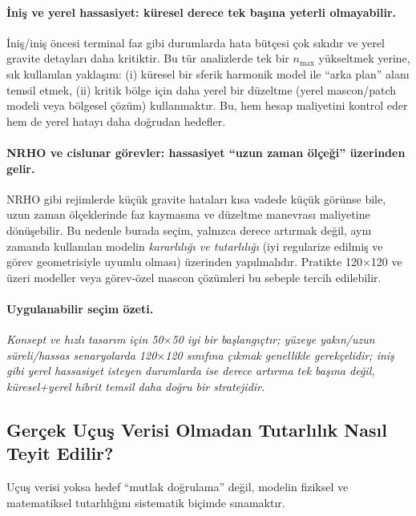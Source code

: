 \paragraph{İniş ve yerel hassasiyet: küresel derece tek başına yeterli olmayabilir.}
İniş/iniş öncesi terminal faz gibi durumlarda hata bütçesi çok sıkıdır ve yerel gravite detayları daha kritiktir.
Bu tür analizlerde tek bir $n_{\max}$ yükseltmek yerine, sık kullanılan yaklaşım:
(i) küresel bir sferik harmonik model ile ``arka plan'' alanı temsil etmek,
(ii) kritik bölge için daha yerel bir düzeltme (yerel mascon/patch modeli veya bölgesel çözüm)
kullanmaktır. Bu, hem hesap maliyetini kontrol eder hem de yerel hatayı daha doğrudan hedefler.

\paragraph{NRHO ve cislunar görevler: hassasiyet ``uzun zaman ölçeği'' üzerinden gelir.}
NRHO gibi rejimlerde küçük gravite hataları kısa vadede küçük görünse bile,
uzun zaman ölçeklerinde faz kaymasına ve düzeltme manevrası maliyetine dönüşebilir.
Bu nedenle burada seçim, yalnızca derece artırmak değil, aynı zamanda kullanılan modelin
\emph{kararlılığı ve tutarlılığı} (iyi regularize edilmiş ve görev geometrisiyle uyumlu olması)
üzerinden yapılmalıdır. Pratikte 120$\times$120 ve üzeri modeller veya görev-özel mascon çözümleri
bu sebeple tercih edilebilir.

\paragraph{Uygulanabilir seçim özeti.}
\emph{Konsept ve hızlı tasarım için 50$\times$50 iyi bir başlangıçtır; yüzeye yakın/uzun süreli/hassas senaryolarda 120$\times$120 sınıfına çıkmak genellikle gerekçelidir; iniş gibi yerel hassasiyet isteyen durumlarda ise derece artırma tek başına değil, küresel+yerel hibrit temsil daha doğru bir stratejidir.}





\subsection{Gerçek Uçuş Verisi Olmadan Tutarlılık Nasıl Teyit Edilir?}

Uçuş verisi yoksa hedef ``mutlak doğrulama'' değil,
modelin fiziksel ve matematiksel tutarlılığını sistematik biçimde sınamaktır.

